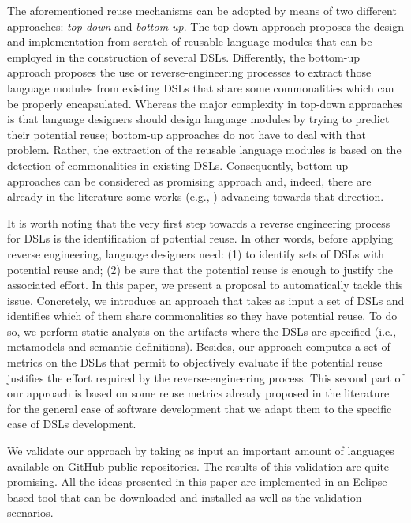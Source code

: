 The aforementioned reuse mechanisms can be adopted by means of two different approaches: \textit{top-down} and \textit{bottom-up}. The top-down approach proposes the design and implementation from scratch of reusable language modules that can be employed in the construction of several DSLs. Differently, the bottom-up approach proposes the use or reverse-engineering processes to extract those language modules from existing DSLs that share some commonalities which can be properly encapsulated. Whereas the major complexity in top-down approaches is that language designers should design language modules by trying to predict their potential reuse; bottom-up approaches do not have to deal with that problem. Rather, the extraction of the reusable language modules is based on the detection of commonalities in existing DSLs. Consequently, bottom-up approaches can be considered as promising approach and, indeed, there are already in the literature some works (e.g., \cite{vacchi:2014}) advancing towards that direction. 

It is worth noting that the very first step towards a reverse engineering process for DSLs is the identification of potential reuse. In other words, before applying reverse engineering, language designers need: (1) to identify sets of DSLs with potential reuse and; (2) be sure that the potential reuse is enough to justify the associated effort. In this paper, we present a proposal to automatically tackle this issue. Concretely, we introduce an approach that takes as input a set of DSLs and identifies which of them share commonalities so they have potential reuse. To do so, we perform static analysis on the artifacts where the DSLs are specified (i.e., metamodels and semantic definitions). Besides, our approach computes a set of metrics on the DSLs that permit to objectively evaluate if the potential reuse justifies the effort required by the reverse-engineering process. This second part of our approach is based on some reuse metrics already proposed in the literature for the general case of software development \cite{Berger:2014,Berger:126283} that we adapt them to the specific case of DSLs development.

We validate our approach by taking as input an important amount of languages available on GitHub public repositories. The results of this validation are quite promising. All the ideas presented in this paper are implemented in an Eclipse-based tool that can be downloaded and installed as well as the validation scenarios. 

